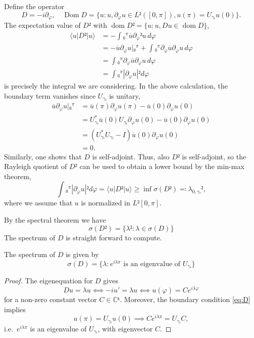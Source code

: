 Define the operator
\begin{equation}\label{eq:D}
  D = -i∂_φ, \quad \operatorname{Dom}D = \{u : u, ∂_φ u ∈ L²([0,π]), u(π) = U_{γᵣ}u(0)\}.
\end{equation}
The expectation value of $D²$ with $\operatorname{dom} D² = \{ u : u, Du ∈ \operatorname{dom}D \}$,
\begin{equation}
  \begin{aligned}
    ⟨u|D²|u⟩
    &= -∫₀^π \overline{u} ∂_φ² u \,dφ \\
    &= -\overline{u}∂_φu\Big|₀^π + ∫₀^π ∂_φ\overline{u} ∂_φ u \,dφ \\
    &= ∫₀^π ∂_φ\overline{u} ∂_φ u \,dφ \\
    &= ∫₀^π |∂_φu|² dφ
  \end{aligned}
\end{equation}
is precisely the integral we are considering. In the above calculation, the boundary term vanishes since $U_{γᵣ}$ is unitary,
\begin{equation}
  \begin{aligned}
    \overline{u}∂_φu\Big|₀^π
    &= \overline{u}(π)∂_φu(π) - \overline{u}(0)∂_φu(0) \\
    &= U_{γᵣ}^*\overline{u}(0)U_{γᵣ}∂_φu(0) - \overline{u}(0)∂_φu(0) \\
    &= (U_{γᵣ}^*U_{γᵣ} - I)\overline{u}(0)∂_φu(0) \\
    &= 0.
  \end{aligned}
\end{equation}
Similarly, one shows that $D$ is self-adjoint. Thus, also $D²$ is self-adjoint, so the Rayleigh quotient of $D²$ can be used to obtain a lower bound by the min-max theorem,
\begin{equation}
  ∫₀^π |∂_φu|² dφ = ⟨u|D²|u⟩ ≥ \inf σ(D²) ≕ λ_{0,γᵣ}²,
\end{equation}
where we assume that $u$ is normalized in $L²[0,π]$.

By the spectral theorem we have
\begin{equation}
  σ(D²) = \{λ² : λ ∈ σ(D)\}
\end{equation}
The spectrum of $D$ is straight forward to compute.

\begin{lemma}
  The spectrum of $D$ is given by
  \begin{equation}
    σ(D) = \{ λ : e^{iλπ} \text{ is an eigenvalue of $U_{γᵣ}$} \}
  \end{equation}
\end{lemma}
\begin{proof}
  The eigenequation for $D$ gives
  \begin{equation}
    Du = λu ⟺ -iu' = λu ⟺ u(φ) = C e^{iλφ}
  \end{equation}
  for a non-zero constant vector $C ∈ ℂᵏ$. Moreover, the boundary condition \cref{eq:D} implies
  \begin{equation}
    u(π) = U_{γᵣ} u(0) ⟹ Ce^{iλπ} = U_{γᵣ}C,
  \end{equation}
  i.e.\ $e^{iλπ}$ is an eigenvalue of $U_{γᵣ}$, with eigenvector $C$.
\end{proof}

